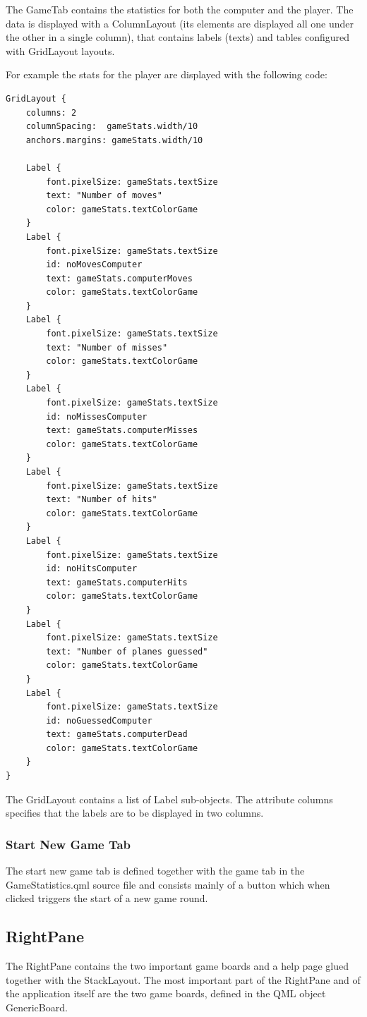 The GameTab contains the statistics for both the computer and the player. The data is displayed with a ColumnLayout (its elements are displayed all one under the other in a single column), that contains labels (texts) and tables configured with GridLayout layouts.

For example the stats for the player are displayed with the following code:

\begin{lstlisting}
GridLayout {
	columns: 2
	columnSpacing:  gameStats.width/10
	anchors.margins: gameStats.width/10
	
	Label {
		font.pixelSize: gameStats.textSize
		text: "Number of moves"
		color: gameStats.textColorGame
	}
	Label {
		font.pixelSize: gameStats.textSize
		id: noMovesComputer
		text: gameStats.computerMoves
		color: gameStats.textColorGame
	}
	Label {
		font.pixelSize: gameStats.textSize
		text: "Number of misses"
		color: gameStats.textColorGame
	}
	Label {
		font.pixelSize: gameStats.textSize
		id: noMissesComputer
		text: gameStats.computerMisses
		color: gameStats.textColorGame
	}
	Label {
		font.pixelSize: gameStats.textSize
		text: "Number of hits"
		color: gameStats.textColorGame
	}
	Label {
		font.pixelSize: gameStats.textSize
		id: noHitsComputer
		text: gameStats.computerHits
		color: gameStats.textColorGame
	}
	Label {
		font.pixelSize: gameStats.textSize
		text: "Number of planes guessed"
		color: gameStats.textColorGame
	}
	Label {
		font.pixelSize: gameStats.textSize
		id: noGuessedComputer
		text: gameStats.computerDead
		color: gameStats.textColorGame
	}
}
\end{lstlisting}

The GridLayout contains a list of Label sub-objects. The attribute columns specifies that the labels are to be displayed in two columns.

\subsubsection {Start New Game Tab}

The start new game tab is defined together with the game tab in the GameStatistics.qml source file and consists mainly of a button which when clicked triggers the start of a new game round.

\subsection {RightPane}

The RightPane contains the two important game boards and a help page glued together with the StackLayout. The most important part of the RightPane and of the application itself are the two game boards, defined in the QML object GenericBoard.


